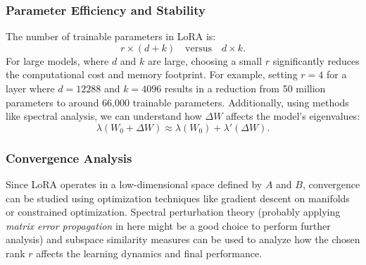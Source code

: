 \documentclass[12pt]{article}
\begin{document}
\subsubsection*{Parameter Efficiency and Stability}
The number of trainable parameters in LoRA is:
\[
r \times (d + k) \quad \text{versus} \quad d \times k.
\]
For large models, where \( d \) and \( k \) are large, choosing a small \( r \) significantly reduces the computational cost and memory footprint. For example, setting \( r = 4 \) for a layer where \( d = 12288 \) and \( k = 4096 \) results in a reduction from 50 million parameters to around 66,000 trainable parameters. Additionally, using methods like spectral analysis, we can understand how \( \Delta W \) affects the model’s eigenvalues:
\[
    \lambda(W_0 + \Delta W) \approx \lambda(W_0) + \lambda'(\Delta W).
\]
\subsubsection*{Convergence Analysis}
Since LoRA operates in a low-dimensional space defined by \( A \) and \( B \), convergence can be studied using optimization techniques like gradient descent on manifolds or constrained optimization. Spectral perturbation theory (probably applying \textit{matrix error propagation} in here might be a good choice to perform further analysis) and subspace similarity measures can be used to analyze how the chosen rank \( r \) affects the learning dynamics and final performance.
\end{document}
